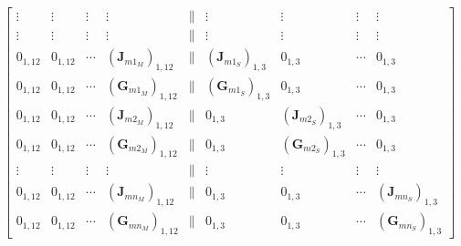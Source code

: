 \begin{equation}
\begin{bmatrix}
        \vdots & \vdots & \vdots & \vdots & \parallel & \vdots & \vdots & \vdots & \vdots \\
        \vdots & \vdots & \vdots & \vdots & \parallel & \vdots & \vdots & \vdots & \vdots \\
        
        0_{1,12} & 0_{1,12} & \cdots & (\mathbf{J}_{m1_M})_{1,12} & \parallel & (\mathbf{J}_{m1_S})_{1,3} & 0_{1,3} & \cdots & 0_{1,3} \\
        0_{1,12} & 0_{1,12} & \cdots & (\mathbf{G}_{m1_M})_{1,12} & \parallel & (\mathbf{G}_{m1_S})_{1,3} & 0_{1,3} & \cdots & 0_{1,3} \\
        0_{1,12} & 0_{1,12} & \cdots & (\mathbf{J}_{m2_M})_{1,12} & \parallel & 0_{1,3} & (\mathbf{J}_{m2_S})_{1,3} & \cdots & 0_{1,3} \\
        0_{1,12} & 0_{1,12} & \cdots & (\mathbf{G}_{m2_M})_{1,12} & \parallel & 0_{1,3} & (\mathbf{G}_{m2_S})_{1,3} & \cdots & 0_{1,3} \\
        \vdots & \vdots & \vdots & \vdots & \parallel & \vdots & \vdots & \vdots & \vdots \\
        0_{1,12} & 0_{1,12} & \cdots & (\mathbf{J}_{mn_M})_{1,12} & \parallel & 0_{1,3} & 0_{1,3} & \cdots & (\mathbf{J}_{mn_S})_{1,3} \\
        0_{1,12} & 0_{1,12} & \cdots & (\mathbf{G}_{mn_M})_{1,12} & \parallel & 0_{1,3} & 0_{1,3} & \cdots & (\mathbf{G}_{mn_S})_{1,3}      
        \end{bmatrix}
\end{equation}
